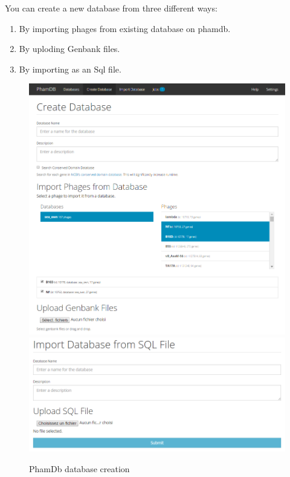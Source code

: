 \documentclass[a4paper,11pt]{report}
\begin{document}
You can create a new database from three different ways:
\begin{enumerate}
	\item By importing phages from existing database on phamdb.
	\item By uploding Genbank files.
	\item By importing as an Sql file.
\end{enumerate}

\begin{figure}[H] 
	\begin{center}
		\includegraphics[scale=0.45]{img/phamdb_create_db}
		\includegraphics[scale=0.45]{img/phamdb_create_db_2}
		\caption{PhamDb database creation}
	\end{center}
\end{figure}
\end{document}
